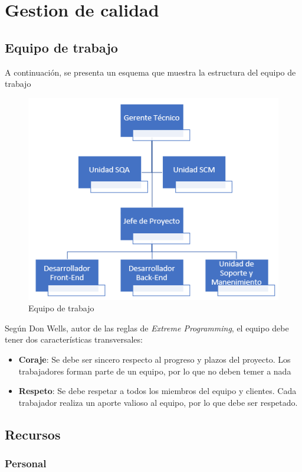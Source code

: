 
\chapter{Gestion de calidad}

\section{Equipo de trabajo}

A continuación, se presenta un esquema que muestra la estructura del equipo de trabajo 
\begin{figure}[ht!]
\centering
\includegraphics[width=.7\textwidth]{figures/equipo-trabajo.png}
\caption{Equipo de trabajo}
\label{fig:Equipo de trabajo, en base a \citealp{web00}}
\end{figure}

Según Don Wells, autor de las reglas de \emph{Extreme Programming},  el equipo debe tener dos características transversales:

	\begin{itemize}
		\item 
		 \textbf{Coraje}: Se debe ser sincero respecto al progreso y plazos del proyecto. Los trabajadores forman parte de un equipo, por lo que no deben temer a nada
		\item
		 \textbf{Respeto}: Se debe respetar a todos los miembros del equipo y clientes. Cada trabajador realiza un aporte valioso al equipo, por lo que debe ser respetado.
	\end{itemize}

\section{Recursos}
\subsection{Personal}
